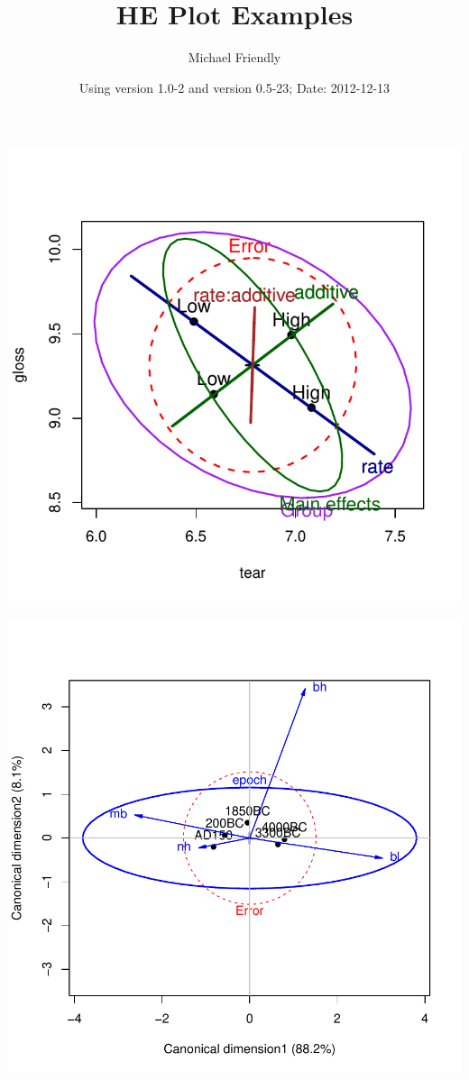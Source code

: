 \documentclass[11pt]{article}
\title{HE Plot Examples}
\author{Michael Friendly}
\date{\footnotesize{Using \Rpackage{heplots} version 1.0-2
	and \Rpackage{candisc} version 0.5-23; Date: 2012-12-13}}
\begin{document}
\maketitle

\begin{minipage}[b]{.3\linewidth}
	\includegraphics[width=\linewidth, trim=0 30 0 30]{fig/plot-plastic2}
\end{minipage}
\begin{minipage}[b]{.3\linewidth}
	\includegraphics[width=\linewidth, trim=0 30 0 30]{fig/plot-skulls-can2}
\end{minipage}
\end{document}

